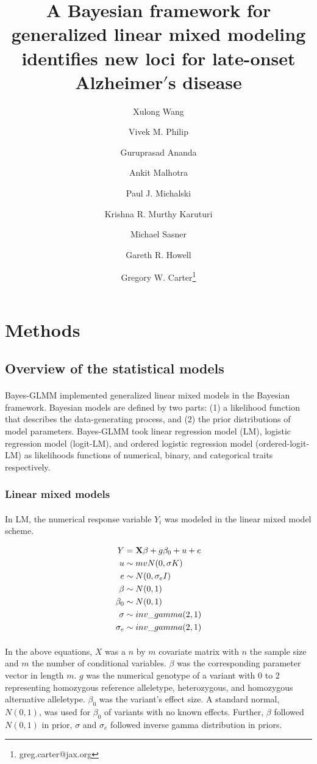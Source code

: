 \documentclass[12pt]{article}
\title{A Bayesian framework for generalized linear mixed modeling identifies new loci for late-onset Alzheimer$'$s disease}
\author[1]{Xulong Wang}
\author[1]{Vivek M. Philip}
\author[2]{Guruprasad Ananda}
\author[2]{Ankit Malhotra}
\author[2]{Paul J. Michalski}
\author[2]{Krishna R. Murthy Karuturi}
\author[2]{Michael Sasner}
\author[1]{Gareth R. Howell}
\author[1]{Gregory W. Carter\thanks{greg.carter@jax.org}}
\affil[1]{The Jackson Laboratory, Bar Harbor, ME}
\affil[2]{The Jackson Laboratory for Genomic Medicine, Farmington, CT}
\date{}
\begin{document}
\maketitle

\section*{Methods}
\subsection*{Overview of the statistical models}

\paragraph{}{
Bayes-GLMM implemented generalized linear mixed models in the Bayesian framework. Bayesian models are defined by two parts: (1) a likelihood function that describes the data-generating process, and (2) the prior distributions of model parameters. Bayes-GLMM took linear regression model (LM), logistic regression model (logit-LM), and ordered logistic regression model (ordered-logit-LM) as likelihoods functions of numerical, binary, and categorical traits respectively.}

\subsubsection*{Linear mixed models}

\paragraph{}{
In LM, the numerical response variable $Y_i$ was modeled in the linear mixed model scheme.
}

\begin{align}
   Y & = \bold{X} \beta + g \beta_0 + u + e \\
   u & \sim mvN(0, \sigma K) \\
   e & \sim N(0, \sigma_e I) \\
   \beta & \sim N(0, 1) \\
   \beta_0 & \sim N(0, 1) \\
   \sigma & \sim inv\_gamma(2, 1) \\
   \sigma_e & \sim inv\_gamma(2, 1)
\end{align}

\paragraph{}{
In the above equations, $X$ was a $n$ by $m$ covariate matrix with $n$ the sample size and $m$ the number of conditional variables. $\beta$ was the corresponding parameter vector in length $m$. $g$ was the numerical genotype of a variant with 0 to 2 representing homozygous reference alleletype, heterozygous, and homozygous alternative alleletype. $\beta_0$ was the variant's effect size. A standard normal, $N(0, 1)$, was used for $\beta_0$ of variants with no known effects. Further, $\beta$ followed $N(0, 1)$ in prior, $\sigma$ and $\sigma_e$ followed inverse gamma distribution in priors.
}
\end{document}
